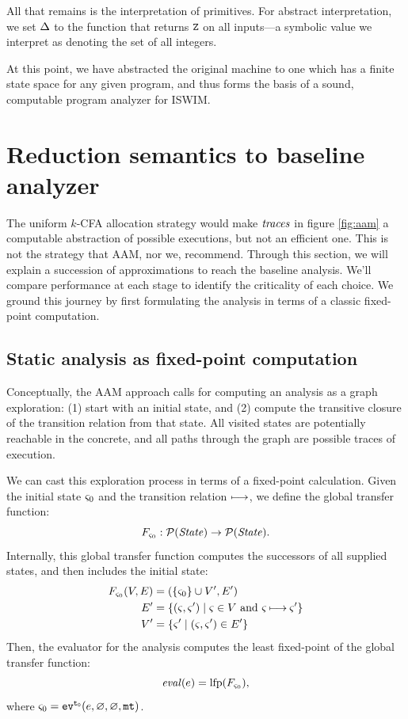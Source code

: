 \documentclass[preprint,onecolumn,9pt]{sigplanconf} %
\begin{document}
All that remains is the interpretation of primitives.  For abstract
interpretation, we set $\interpdelta$ to the function that returns
$\sNum$ on all inputs---a symbolic value we interpret as denoting the
set of all integers.

At this point, we have abstracted the original machine to one which
has a finite state space for any given program, and thus forms the
basis of a sound, computable program analyzer for ISWIM.

\section{Reduction semantics to baseline analyzer}
\label{sec:baseline}

The uniform $k$-CFA allocation strategy would make $\traces$ in figure
\ref{fig:aam} a computable abstraction of possible executions, but not an
efficient one. This is not the strategy that AAM, nor we, recommend. Through
this section, we will explain a succession of approximations
to reach the baseline analysis.  We'll compare performance at each stage to
identify the criticality of each choice. 
%
We ground this journey by first formulating the analysis in terms of a classic
fixed-point computation.


\subsection{Static analysis as fixed-point computation}
\label{sec:fixpoint}

Conceptually, the AAM approach calls for computing an analysis as a
graph exploration: (1) start with an initial state, and (2) compute
the transitive closure of the transition relation from that state. All
visited states are potentially reachable in the concrete, and all
paths through the graph are possible traces of execution.

We can cast this exploration process in terms of a fixed-point calculation.
%
Given the initial state $\mstate_0$ and the transition relation $\machstep$,
we define the global transfer function:
\begin{equation*}
 F_{\mstate_0} : \mathcal{P}(\State) \to \mathcal{P}(\State)
 \text.
\end{equation*}
Internally, this global transfer function computes the successors of all supplied states, and then includes the initial state:
\begin{align*}
  F_{\mstate_0}(V,E) &= (\{ \mstate_0 \} \cup V', E') \\
    E' &= \setof{ (\mstate,\mstate') \mid \mstate \in V \text{ and } \mstate \machstep \mstate'} \\
    V' &= \setof{ \mstate' \mid (\mstate,\mstate') \in E'}
\end{align*}
Then, the evaluator for the analysis computes the least fixed-point of the global transfer function:
\begin{equation*}
 \eval(\mexp) = \mathrm{lfp}(F_{\mstate_0})\text{,}
\end{equation*}
where $\mstate_0 = \ev[^\mtcntr]{\mexp, \varnothing, \varnothing, \kmt}$.
\end{document}
